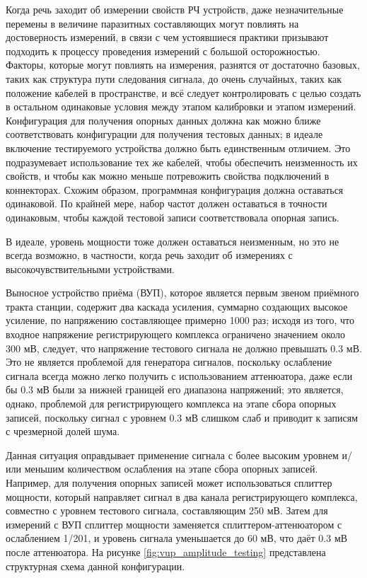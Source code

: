 \documentclass{report}
\begin{document}
Когда речь заходит об измерении свойств РЧ устройств, даже незначительные перемены в величине паразитных составляющих могут повлиять на достоверность измерений, в связи с чем устоявшиеся практики призывают подходить к процессу проведения измерений с большой осторожностью. Факторы, которые могут повлиять на измерения, разнятся от достаточно базовых, таких как структура пути следования сигнала, до очень случайных, таких как положение кабелей в пространстве, и всё следует контролировать с целью создать в остальном одинаковые условия между этапом калибровки и этапом измерений. Конфигурация для получения опорных данных должна как можно ближе соответствовать конфигурации для получения тестовых данных; в идеале включение тестируемого устройства должно быть единственным отличием. Это подразумевает использование тех же кабелей, чтобы обеспечить неизменность их свойств, и чтобы как можно меньше потревожить свойства подключений в коннекторах. Схожим образом, программная конфигурация должна оставаться одинаковой. По крайней мере, набор частот должен оставаться в точности одинаковым, чтобы каждой тестовой записи соответствовала опорная запись.

В идеале, уровень мощности тоже должен оставаться неизменным, но это не всегда возможно, в частности, когда речь заходит об измерениях с высокочувствительными устройствами.

Выносное устройство приёма (ВУП), которое является первым звеном приёмного тракта станции, содержит два каскада усиления, суммарно создающих высокое усиление, по напряжению составляющее примерно 1000 раз; исходя из того, что входное напряжение регистрирующего комплекса ограничено значением около 300 мВ, следует, что напряжение тестового сигнала не должно превышать 0.3 мВ. Это не является проблемой для генератора сигналов, поскольку ослабление сигнала всегда можно легко получить с использованием аттенюатора, даже если бы 0.3 мВ были за нижней границей его диапазона напряжений; это является, однако, проблемой для регистрирующего комплекса на этапе сбора опорных записей, поскольку сигнал с уровнем 0.3 мВ слишком слаб и приводит к записям с чрезмерной долей шума.

Данная ситуация оправдывает применение сигнала с более высоким уровнем и/или меньшим количеством ослабления на этапе сбора опорных записей. Например, для получения опорных записей может использоваться сплиттер мощности, который направляет сигнал в два канала регистрирующего комплекса, совместно с уровнем тестового сигнала, составляющим 250 мВ. Затем для измерений с ВУП сплиттер мощности заменяется сплиттером-аттенюатором с ослаблением 1/201, и уровень сигнала уменьшается до 60 мВ, что даёт 0.3 мВ после аттенюатора. На рисунке \ref{fig:vup_amplitude_testing} представлена структурная схема данной конфигурации.
\end{document}

